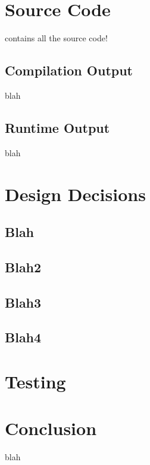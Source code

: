 \documentclass[12pt]{article}
\begin{document}
\maketitle

\begin{abstract}

\end{abstract}

\section{Source Code}
contains all the source code!

\subsection{Compilation Output}
blah

\subsection{Runtime Output}
blah

\section{Design Decisions}
\subsection{Blah}
\subsection{Blah2}
\subsection{Blah3}
\subsection{Blah4}

\section{Testing}

\section{Conclusion}
blah
\end{document}
